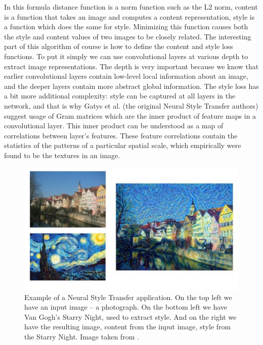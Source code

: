 \documentclass[b5paper]{book}
\let\cite\parencite
\begin{document}
In this formula distance function is a norm function such as the L2 norm, content is a function that takes an image and computes a content representation, style is a function which does the same for style. Minimizing this function causes both the style and content values of two images to be closely related. The interesting part of this algorithm of course is how to define the content and style loss functions. To put it simply we can use convolutional layers at various depth to extract image representations. The depth is very important because we know that earlier convolutional layers contain low-level local information about an image, and the deeper layers contain more abstract global information. The style loss has a bit more additional complexity: style can be captured at all layers in the network, and that is why Gatys et al. (the original Neural Style Transfer authors) suggest usage of Gram matrices which are the inner product of feature maps in a convolutional layer. This inner product can be understood as a map of correlations between layer's features.  These feature correlations contain the statistics of the patterns of a particular spatial scale, which empirically were found to be the textures in an image.

\begin{figure}
    \centering
    \includegraphics[scale=0.45]{figures/nst.png}
    \caption{Example of a Neural Style Transfer application. On the top left we have an input image -- a photograph. On the bottom left we have Van Gogh's Starry Night, used to extract style. And on the right we have the resulting image, content from the input image, style from the Starry Night. Image taken from \cite{chollet2018deep}.}
    \label{fig:nst}
\end{figure}
\end{document}
